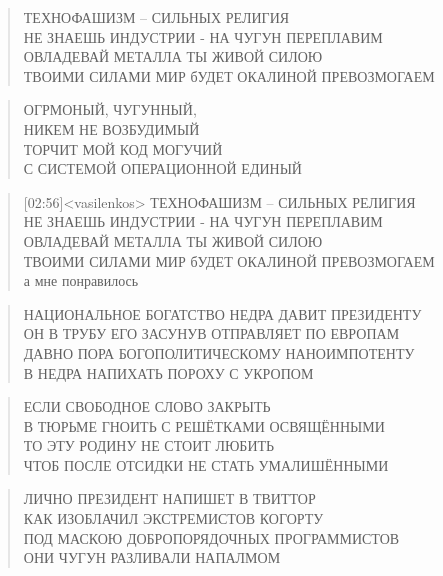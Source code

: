 \poemtitle{***}
\begin{verse}
ТЕХНОФАШИЗМ -- СИЛЬНЫХ РЕЛИГИЯ\\
НЕ ЗНАЕШЬ ИНДУСТРИИ - НА ЧУГУН ПЕРЕПЛАВИМ\\
ОВЛАДЕВАЙ МЕТАЛЛА ТЫ ЖИВОЙ СИЛОЮ\\
ТВОИМИ СИЛАМИ МИР бУДЕТ ОКАЛИНОЙ ПРЕВОЗМОГАЕМ
\end{verse}

\poemtitle{***}
\begin{verse}
ОГРМОНЫЙ, ЧУГУННЫЙ, \\
НИКЕМ НЕ ВОЗБУДИМЫЙ\\
ТОРЧИТ МОЙ КОД МОГУЧИЙ \\
С СИСТЕМОЙ ОПЕРАЦИОННОЙ ЕДИНЫЙ
\end{verse}

\poemtitle{***}
\begin{verse}
[02:56]<vasilenkos> ТЕХНОФАШИЗМ -- СИЛЬНЫХ РЕЛИГИЯ\\
НЕ ЗНАЕШЬ ИНДУСТРИИ - НА ЧУГУН ПЕРЕПЛАВИМ\\
ОВЛАДЕВАЙ МЕТАЛЛА ТЫ ЖИВОЙ СИЛОЮ\\
ТВОИМИ СИЛАМИ МИР бУДЕТ ОКАЛИНОЙ ПРЕВОЗМОГАЕМ\\
а мне понравилось
\end{verse}

\poemtitle{***}
\begin{verse}
НАЦИОНАЛЬНОЕ БОГАТСТВО НЕДРА ДАВИТ ПРЕЗИДЕНТУ\\
ОН В ТРУБУ ЕГО ЗАСУНУВ ОТПРАВЛЯЕТ ПО ЕВРОПАМ\\
ДАВНО ПОРА БОГОПОЛИТИЧЕСКОМУ НАНОИМПОТЕНТУ\\
В НЕДРА НАПИХАТЬ ПОРОХУ С УКРОПОМ
\end{verse}

\poemtitle{***}
\begin{verse}
ЕСЛИ СВОБОДНОЕ СЛОВО ЗАКРЫТЬ\\
В ТЮРЬМЕ ГНОИТЬ С РЕШЁТКАМИ ОСВЯЩЁННЫМИ\\
ТО ЭТУ РОДИНУ НЕ СТОИТ ЛЮБИТЬ\\
ЧТОБ ПОСЛЕ ОТСИДКИ НЕ СТАТЬ УМАЛИШЁННЫМИ
\end{verse}

\poemtitle{***}
\begin{verse}
ЛИЧНО ПРЕЗИДЕНТ НАПИШЕТ В ТВИТТОР\\
КАК ИЗОБЛАЧИЛ ЭКСТРЕМИСТОВ КОГОРТУ\\
ПОД МАСКОЮ ДОБРОПОРЯДОЧНЫХ ПРОГРАММИСТОВ\\
ОНИ ЧУГУН РАЗЛИВАЛИ НАПАЛМОМ
\end{verse}

